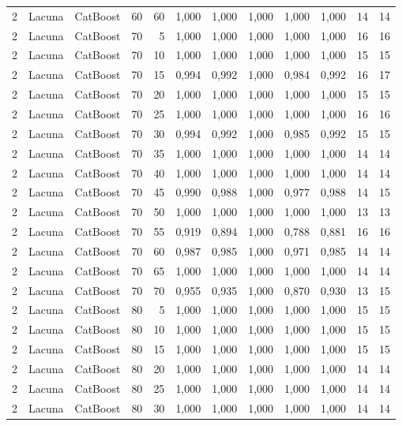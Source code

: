 \begin{longtable}{@{}rllrrrrrrrrr@{}}
2 & Lacuna & CatBoost & 60 & 60 & 1,000 & 1,000 & 1,000 & 1,000 & 1,000 & 14 & 14 \\
2 & Lacuna & CatBoost & 70 & 5 & 1,000 & 1,000 & 1,000 & 1,000 & 1,000 & 16 & 16 \\
2 & Lacuna & CatBoost & 70 & 10 & 1,000 & 1,000 & 1,000 & 1,000 & 1,000 & 15 & 15 \\
2 & Lacuna & CatBoost & 70 & 15 & 0,994 & 0,992 & 1,000 & 0,984 & 0,992 & 16 & 17 \\
2 & Lacuna & CatBoost & 70 & 20 & 1,000 & 1,000 & 1,000 & 1,000 & 1,000 & 15 & 15 \\
2 & Lacuna & CatBoost & 70 & 25 & 1,000 & 1,000 & 1,000 & 1,000 & 1,000 & 16 & 16 \\
2 & Lacuna & CatBoost & 70 & 30 & 0,994 & 0,992 & 1,000 & 0,985 & 0,992 & 15 & 15 \\
2 & Lacuna & CatBoost & 70 & 35 & 1,000 & 1,000 & 1,000 & 1,000 & 1,000 & 14 & 14 \\
2 & Lacuna & CatBoost & 70 & 40 & 1,000 & 1,000 & 1,000 & 1,000 & 1,000 & 14 & 14 \\
2 & Lacuna & CatBoost & 70 & 45 & 0,990 & 0,988 & 1,000 & 0,977 & 0,988 & 14 & 15 \\
2 & Lacuna & CatBoost & 70 & 50 & 1,000 & 1,000 & 1,000 & 1,000 & 1,000 & 13 & 13 \\
2 & Lacuna & CatBoost & 70 & 55 & 0,919 & 0,894 & 1,000 & 0,788 & 0,881 & 16 & 16 \\
2 & Lacuna & CatBoost & 70 & 60 & 0,987 & 0,985 & 1,000 & 0,971 & 0,985 & 14 & 14 \\
2 & Lacuna & CatBoost & 70 & 65 & 1,000 & 1,000 & 1,000 & 1,000 & 1,000 & 14 & 14 \\
2 & Lacuna & CatBoost & 70 & 70 & 0,955 & 0,935 & 1,000 & 0,870 & 0,930 & 13 & 15 \\
2 & Lacuna & CatBoost & 80 & 5 & 1,000 & 1,000 & 1,000 & 1,000 & 1,000 & 15 & 15 \\
2 & Lacuna & CatBoost & 80 & 10 & 1,000 & 1,000 & 1,000 & 1,000 & 1,000 & 15 & 15 \\
2 & Lacuna & CatBoost & 80 & 15 & 1,000 & 1,000 & 1,000 & 1,000 & 1,000 & 15 & 15 \\
2 & Lacuna & CatBoost & 80 & 20 & 1,000 & 1,000 & 1,000 & 1,000 & 1,000 & 14 & 14 \\
2 & Lacuna & CatBoost & 80 & 25 & 1,000 & 1,000 & 1,000 & 1,000 & 1,000 & 14 & 14 \\
2 & Lacuna & CatBoost & 80 & 30 & 1,000 & 1,000 & 1,000 & 1,000 & 1,000 & 14 & 14 \\

\end{longtable}
